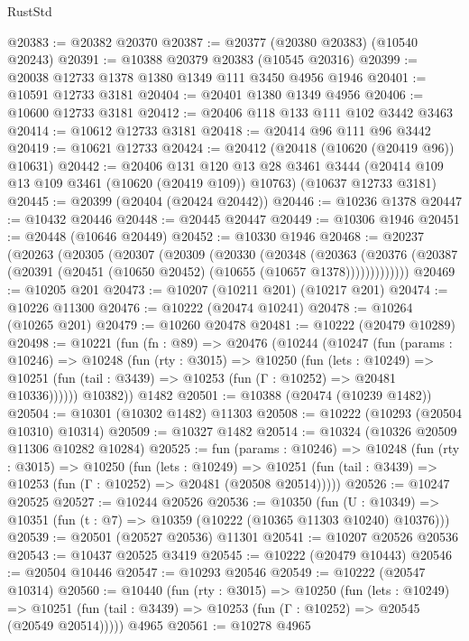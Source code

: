 \begin{lexlean}{RustStd}
\begin{coremodule}
@20383 := @20382 @20370
@20387 := @20377 (@20380 @20383) (@10540 @20243)
@20391 := @10388 @20379 @20383 (@10545 @20316)
@20399 := @20038 @12733 @1378 @1380 @1349 @111 @3450 @4956 @1946
@20401 := @10591 @12733 @3181
@20404 := @20401 @1380 @1349 @4956
@20406 := @10600 @12733 @3181
@20412 := @20406 @118 @133 @111 @102 @3442 @3463
@20414 := @10612 @12733 @3181
@20418 := @20414 @96 @111 @96 @3442
@20419 := @10621 @12733
@20424 := @20412 (@20418 (@10620 (@20419 @96)) @10631)
@20442 := @20406
    @131
    @120
    @13
    @28
    @3461
    @3444
    (@20414 @109 @13 @109 @3461 (@10620 (@20419 @109)) @10763)
    (@10637 @12733 @3181)
@20445 := @20399 (@20404 (@20424 @20442))
@20446 := @10236 @1378
@20447 := @10432 @20446
@20448 := @20445 @20447
@20449 := @10306 @1946
@20451 := @20448 (@10646 @20449)
@20452 := @10330 @1946
@20468 := @20237
    (@20263
      (@20305
        (@20307
          (@20309
            (@20330
              (@20348
                (@20363
                  (@20376 (@20387 (@20391 (@20451 (@10650 @20452) (@10655 (@10657 @1378)))))))))))))
@20469 := @10205 @201
@20473 := @10207 (@10211 @201) (@10217 @201)
@20474 := @10226 @11300
@20476 := @10222 (@20474 @10241)
@20478 := @10264 (@10265 @201)
@20479 := @10260 @20478
@20481 := @10222 (@20479 @10289)
@20498 := @10221
    (fun (fn : @89) =>
    @20476
      (@10244
        (@10247
          (fun (params : @10246) =>
          @10248
            (fun (rty : @3015) =>
            @10250
              (fun (lets : @10249) =>
              @10251 (fun (tail : @3439) => @10253 (fun (Γ : @10252) => @20481 @10336))))))
        @10382))
    @1482
@20501 := @10388 (@20474 (@10239 @1482))
@20504 := @10301 (@10302 @1482) @11303
@20508 := @10222 (@10293 (@20504 @10310) @10314)
@20509 := @10327 @1482
@20514 := @10324 (@10326 @20509 @11306 @10282 @10284)
@20525 := fun (params : @10246) =>
  @10248
    (fun (rty : @3015) =>
    @10250
      (fun (lets : @10249) =>
      @10251 (fun (tail : @3439) => @10253 (fun (Γ : @10252) => @20481 (@20508 @20514)))))
@20526 := @10247 @20525
@20527 := @10244 @20526
@20536 := @10350
    (fun (U : @10349) => @10351 (fun (t : @7) => @10359 (@10222 (@10365 @11303 @10240) @10376)))
@20539 := @20501 (@20527 @20536) @11301
@20541 := @10207 @20526 @20536
@20543 := @10437 @20525 @3419
@20545 := @10222 (@20479 @10443)
@20546 := @20504 @10446
@20547 := @10293 @20546
@20549 := @10222 (@20547 @10314)
@20560 := @10440
    (fun (rty : @3015) =>
    @10250
      (fun (lets : @10249) =>
      @10251 (fun (tail : @3439) => @10253 (fun (Γ : @10252) => @20545 (@20549 @20514)))))
    @4965
@20561 := @10278 @4965

\end{coremodule}
\end{lexlean}
